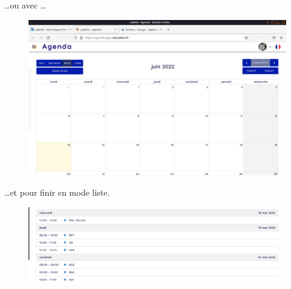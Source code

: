 \ldots ou avec \ldots
\begin{figure}
    \centering
    \includegraphics[width=0.500\linewidth]{Captures/agenda.mois.we.png}
\end{figure}
\ldots et pour finir en mode liste.
\begin{figure}
	\centering
	\includegraphics{./Captures/agenda.liste.png}
\end{figure}


